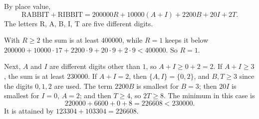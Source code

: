 By place value,
\[\text{RABBIT}+\text{RIBBIT}=200000R+10000(A+I)+2200B+20I+2T.\]
The letters R, A, B, I, T are five different digits.

With $R\ge2$ the sum is at least $400000$, while $R=1$ keeps it below $200000+10000\cdot17+2200\cdot9+20\cdot9+2\cdot9<400000$. So $R=1$.

Next, $A$ and $I$ are different digits other than $1$, so $A+I\ge0+2=2$. If $A+I\ge3$, the sum is at least $230000$. If $A+I=2$, then $\{A,I\}=\{0,2\}$, and $B,T\ge3$ since the digits $0,1,2$ are used. The term $2200B$ is smallest for $B=3$; then $20I$ is smallest for $I=0$, $A=2$; and then $T\ge4$, so $2T\ge8$. The minimum in this case is
\[220000+6600+0+8=226608<230000.\]
It is attained by $123304+103304=\boxed{226608}$.
